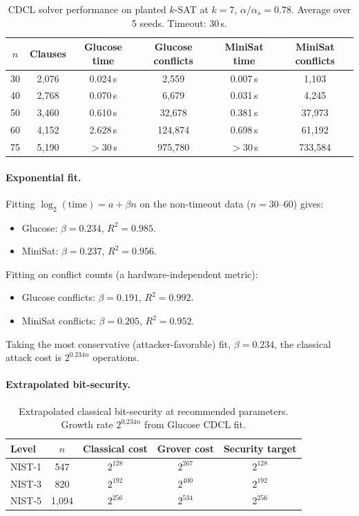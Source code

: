 \documentclass[11pt]{article}
\begin{document}
\begin{table}[ht]
\centering
\caption{CDCL solver performance on planted $k$-SAT at $k = 7$, $\alpha/\alpha_s = 0.78$.  Average over 5 seeds.  Timeout: 30\,s.}\label{tab:cryptanalysis}
\begin{tabular}{@{}cccccc@{}}
\toprule
$n$ & Clauses & Glucose time & Glucose conflicts & MiniSat time & MiniSat conflicts \\
\midrule
30  & 2{,}076  & 0.024\,s     & 2{,}559   & 0.007\,s     & 1{,}103 \\
40  & 2{,}768  & 0.070\,s     & 6{,}679   & 0.031\,s     & 4{,}245 \\
50  & 3{,}460  & 0.610\,s     & 32{,}678  & 0.381\,s     & 37{,}973 \\
60  & 4{,}152  & 2.628\,s     & 124{,}874 & 0.698\,s     & 61{,}192 \\
75  & 5{,}190  & $> 30$\,s    & 975{,}780 & $> 30$\,s    & 733{,}584 \\
\bottomrule
\end{tabular}
\end{table}

\paragraph{Exponential fit.}
Fitting $\log_2(\text{time}) = a + \beta n$ on the non-timeout data ($n = 30$--$60$) gives:
\begin{itemize}
\item Glucose: $\beta = 0.234$, $R^2 = 0.985$.
\item MiniSat: $\beta = 0.237$, $R^2 = 0.956$.
\end{itemize}
Fitting on conflict counts (a hardware-independent metric):
\begin{itemize}
\item Glucose conflicts: $\beta = 0.191$, $R^2 = 0.992$.
\item MiniSat conflicts: $\beta = 0.205$, $R^2 = 0.952$.
\end{itemize}
Taking the most conservative (attacker-favorable) fit, $\beta = 0.234$, the classical attack cost is $2^{0.234n}$ operations.

\paragraph{Extrapolated bit-security.}

\begin{table}[ht]
\centering
\caption{Extrapolated classical bit-security at recommended parameters.  Growth rate $2^{0.234n}$ from Glucose CDCL fit.}\label{tab:bitsec}
\begin{tabular}{@{}lcccc@{}}
\toprule
Level & $n$ & Classical cost & Grover cost & Security target \\
\midrule
NIST-1 & 547 & $2^{128}$ & $2^{267}$ & $2^{128}$ \\
NIST-3 & 820 & $2^{192}$ & $2^{400}$ & $2^{192}$ \\
NIST-5 & 1{,}094 & $2^{256}$ & $2^{534}$ & $2^{256}$ \\
\bottomrule
\end{tabular}
\end{table}
\end{document}
